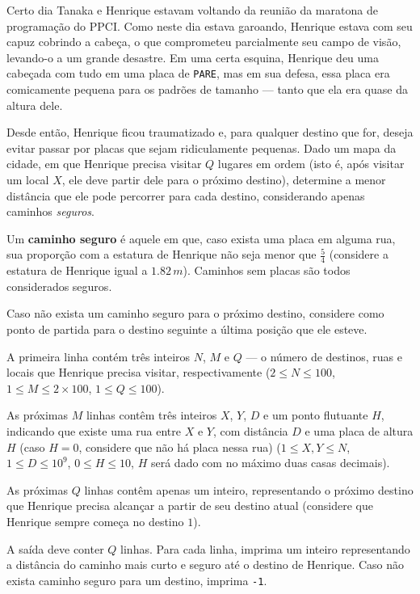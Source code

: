 Certo dia Tanaka e Henrique estavam voltando da reunião da maratona de programação do PPCI. Como neste dia estava garoando, Henrique estava com seu capuz cobrindo a cabeça, o que comprometeu parcialmente seu campo de visão, levando-o a um grande desastre.  
Em uma certa esquina, Henrique deu uma cabeçada com tudo em uma placa de \texttt{PARE}, mas em sua defesa, essa placa era comicamente pequena para os padrões de tamanho — tanto que ela era quase da altura dele.  

Desde então, Henrique ficou traumatizado e, para qualquer destino que for, deseja evitar passar por placas que sejam ridiculamente pequenas.  
Dado um mapa da cidade, em que Henrique precisa visitar $Q$ lugares em ordem
(isto é, após visitar um local $X$, ele deve partir dele para o próximo
 destino), determine a menor distância que ele pode percorrer para cada destino,
    considerando apenas caminhos \textit{seguros}.

Um \textbf{caminho seguro} é aquele em que, caso exista uma placa em alguma rua, sua proporção com a estatura de Henrique não seja menor que $\displaystyle\frac{5}{4}$ (considere a estatura de Henrique igual a $1.82\,m$). Caminhos sem placas são todos considerados seguros.

Caso não exista um caminho seguro para o próximo destino, considere como ponto de partida para o destino seguinte a última posição que ele esteve.



A primeira linha contém três inteiros $N$, $M$ e $Q$ — o número de destinos, ruas e locais que Henrique precisa visitar, respectivamente  
($2 \leq N \leq 100$, $1 \leq M \leq 2 \times 100$, $1 \leq Q \leq 100$).  

As próximas $M$ linhas contêm três inteiros $X$, $Y$, $D$ e um ponto flutuante $H$, indicando que existe uma rua entre $X$ e $Y$, com distância $D$ e uma placa de altura $H$ (caso $H = 0$, considere que não há placa nessa rua)
($1 \leq X, Y \leq N$, $1 \leq D \leq 10^9$, $0 \leq H \leq 10$, $H$ será dado
 com no máximo duas casas decimais).

As próximas $Q$ linhas contêm apenas um inteiro, representando o próximo destino que Henrique precisa alcançar a partir de seu destino atual (considere que Henrique sempre começa no destino $1$).


A saída deve conter $Q$ linhas.  
Para cada linha, imprima um inteiro representando a distância do caminho mais curto e seguro até o destino de Henrique.  
Caso não exista caminho seguro para um destino, imprima \texttt{-1}.

